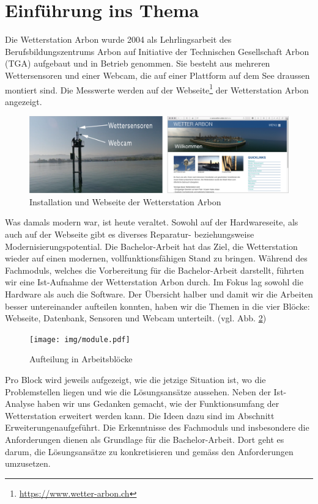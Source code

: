 \section*{Einführung ins Thema}

Die Wetterstation Arbon wurde 2004 als Lehrlingsarbeit des Berufsbildungszentrums Arbon auf Initiative der Technischen Gesellschaft Arbon (TGA) aufgebaut und in Betrieb genommen. Sie besteht aus mehreren Wettersensoren und einer Webcam, die auf einer Plattform auf dem See draussen montiert sind. Die Messwerte werden auf der Webseite\footnote{ \url{https://www.wetter-arbon.ch}}  der Wetterstation Arbon angezeigt.

\begin{figure}[h!]
	\centering
	\includegraphics[width=1\linewidth]{img/kombi}
	\caption{Installation und Webseite der Wetterstation Arbon}
	\label{img:wetterstation}
\end{figure}

Was damals modern war, ist heute veraltet. Sowohl auf der Hardwareseite, als auch auf der Webseite gibt es diverses Reparatur- beziehungsweise Modernisierungspotential. Die Bachelor-Arbeit hat das Ziel, die Wetterstation wieder auf einen modernen, vollfunktionsfähigen Stand zu bringen. Während des Fachmoduls, welches die Vorbereitung für die Bachelor-Arbeit darstellt, führten wir eine Ist-Aufnahme der Wetterstation Arbon durch. Im Fokus lag sowohl die Hardware als auch die Software. Der Übersicht halber und damit wir die Arbeiten besser untereinander aufteilen konnten, haben wir die Themen in die vier Blöcke:  Webseite, Datenbank, Sensoren und Webcam unterteilt. (vgl. Abb. \ref{img:module})

\vspace{5mm} %

\begin{figure}[h!]
	\centering
	\texttt{[image: img/module.pdf]}
	\caption{Aufteilung in Arbeitsblöcke}
	\label{img:module}
\end{figure}

Pro Block wird jeweils aufgezeigt, wie die jetzige Situation ist, wo die Problemstellen liegen und wie die Lösungsansätze aussehen. Neben der Ist-Analyse haben wir uns Gedanken gemacht, wie der Funktionsumfang der Wetterstation erweitert werden kann. Die Ideen dazu sind im Abschnitt \flqq Erweiterungen\frqq aufgeführt. Die Erkenntnisse des Fachmoduls und insbesondere die Anforderungen dienen als Grundlage für die Bachelor-Arbeit. Dort geht es darum, die Lösungsansätze zu konkretisieren und gemäss den Anforderungen umzusetzen.

\newpage

